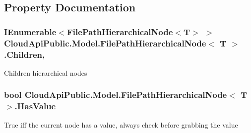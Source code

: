 \subsection{Property Documentation}
\hypertarget{class_cloud_api_public_1_1_model_1_1_file_path_hierarchical_node_3_01_t_01_4_a6292b8bdd5edc395ce0cb6f242b6706c}{
\subsubsection[{Children}]{\setlength{\rightskip}{0pt plus 5cm}I\-Enumerable$<$File\-Path\-Hierarchical\-Node$<$T$>$ $>$ Cloud\-Api\-Public.\-Model.\-File\-Path\-Hierarchical\-Node$<$ T $>$.Children\hspace{0.3cm}{\ttfamily [get]}, {\ttfamily [set]}}}\label{class_cloud_api_public_1_1_model_1_1_file_path_hierarchical_node_3_01_t_01_4_a6292b8bdd5edc395ce0cb6f242b6706c}


Children hierarchical nodes 

\hypertarget{class_cloud_api_public_1_1_model_1_1_file_path_hierarchical_node_3_01_t_01_4_acdcd3b4c556b0a1760bef4ca6ef307db}{
\subsubsection[{Has\-Value}]{\setlength{\rightskip}{0pt plus 5cm}bool Cloud\-Api\-Public.\-Model.\-File\-Path\-Hierarchical\-Node$<$ T $>$.Has\-Value\hspace{0.3cm}{\ttfamily [get]}}}\label{class_cloud_api_public_1_1_model_1_1_file_path_hierarchical_node_3_01_t_01_4_acdcd3b4c556b0a1760bef4ca6ef307db}


True iff the current node has a value, always check before grabbing the value 

